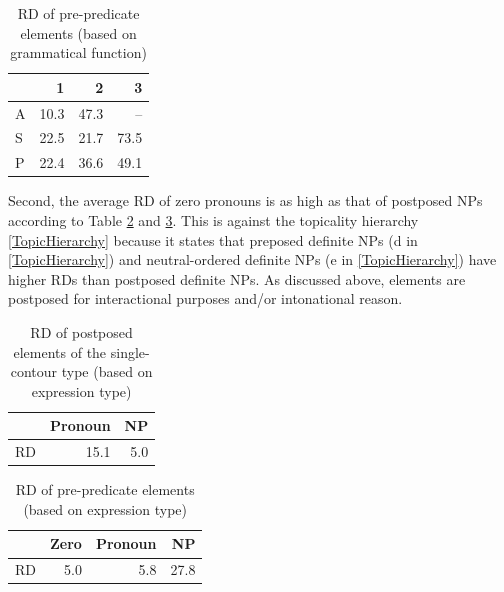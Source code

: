 \begin{table}
\centering
\caption{RD of pre-predicate elements (based on grammatical function)}
\label{RDASP}
\begin{tabular}{lrrr}
\toprule
		& 1	& 2	& 3 \\
\midrule
	A	& 10.3	& 47.3	& -- \\
	S	& 22.5	& 21.7	& 73.5 \\
	P	& 22.4	& 36.6	& 49.1 \\
\bottomrule
\end{tabular}
\end{table}

Second,
the average RD of zero pronouns is as high as that of postposed NPs
according to Table \ref{RDPostExpTypeT} and \ref{RDPreExpTypeT}.
This is against the topicality hierarchy \ref{TopicHierarchy}
because it states that
preposed definite NPs (d in \ref{TopicHierarchy}) and neutral-ordered definite NPs (e in \ref{TopicHierarchy}) have
higher RDs than
postposed definite NPs.
As discussed above,
elements are postposed for interactional purposes and/or intonational reason.


\begin{table}
\centering
\caption{RD of postposed elements of the single-contour type (based on expression type)}
\begin{tabular}{lrr}
\toprule
  & Pronoun & NP \\
\midrule
RD & 15.1 & 5.0 \\
\bottomrule
\end{tabular}
\label{RDPostExpTypeT}
\end{table}
\begin{table}
\centering
\caption{RD of pre-predicate elements (based on expression type)}
\begin{tabular}{lrrr}
\toprule
     & Zero & Pronoun & NP \\
\midrule
 RD  & 5.0  & 5.8     & 27.8 \\
\bottomrule
\end{tabular}
\label{RDPreExpTypeT}
\end{table}

